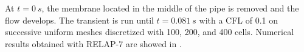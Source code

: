 \documentclass{inputs/mc2015}
\begin{document}
At $t = 0\ s$, the membrane located in the middle of the pipe is removed and the flow develops. The transient is run until $t = 0.081\ s$ with a CFL of 0.1 on successive uniform meshes discretized with 100, 200, and 400 cells. Numerical results obtained with RELAP-7 are showed in .
\end{document}
